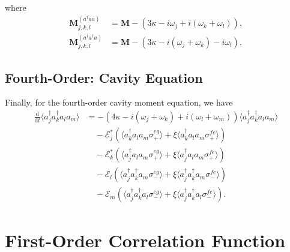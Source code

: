 \documentclass{article}
\newcommand{\ddt}{\frac{\mathrm{d}}{\mathrm{d}t}}
\begin{document}
where
\begin{subequations}
\begin{align}
	\bm{M}_{j, k, l}^{(a^{\dagger} a a)} &= \bm{M} - \left( 3 \kappa - i \omega_{j} + i \left( \omega_{k} + \omega_{l} \right) \right), \\
	\bm{M}_{j, k, l}^{(a^{\dagger} a^{\dagger} a)} &= \bm{M} - \left( 3 \kappa - i \left( \omega_{j} + \omega_{k} \right) - i \omega_{l} \right).
\end{align}
\end{subequations}

\subsection{Fourth-Order: Cavity Equation}

Finally, for the fourth-order cavity moment equation, we have
\begin{align}
	\ddt \langle a^{\dagger}_{j} a^{\dagger}_{k} a_{l} a_{m} \rangle &= -\left( 4 \kappa - i \left( \omega_{j} + \omega_{k} \right) + i \left( \omega_{l} + \omega_{m} \right) \right) \langle a^{\dagger}_{j} a^{\dagger}_{k} a_{l} a_{m} \rangle \nonumber \\
	&\quad - \mathcal{E}_{j}^{*} \left( \langle a^{\dagger}_{k} a_{l} a_{m} \sigma^{eg}_{+} \rangle + \xi \langle a^{\dagger}_{k} a_{l} a_{m} \sigma^{fe}_{+} \rangle \right) \nonumber \\
	&\quad - \mathcal{E}_{k}^{*} \left( \langle a^{\dagger}_{j} a_{l} a_{m} \sigma^{eg}_{+} \rangle + \xi \langle a^{\dagger}_{j} a_{l} a_{m} \sigma^{fe}_{+} \rangle \right) \nonumber \\
	&\quad - \mathcal{E}_{l} \left( \langle a^{\dagger}_{j} a^{\dagger}_{k} a_{m} \sigma^{eg}_{-} \rangle + \xi \langle a^{\dagger}_{j} a^{\dagger}_{k} a_{m} \sigma^{fe}_{-} \rangle \right) \nonumber \\
	&\quad - \mathcal{E}_{m} \left( \langle a^{\dagger}_{j} a^{\dagger}_{k} a_{l} \sigma^{eg}_{-} \rangle + \xi \langle a^{\dagger}_{j} a^{\dagger}_{k} a_{l} \sigma^{fe}_{-} \rangle \right).
\end{align}

\section{First-Order Correlation Function}
\end{document}

